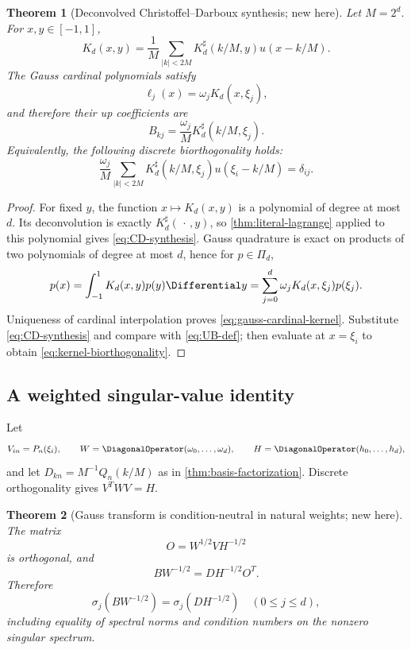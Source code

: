 \documentclass[11pt]{article}
\newtheorem{theorem}{Theorem}[section]
\theoremstyle{definition}
\theoremstyle{remark}
\newcommand{\PiD}{\Pi_d}
\begin{document}
\begin{theorem}[Deconvolved Christoffel--Darboux synthesis; new here]
\label{thm:CD-synthesis}
Let $M=2^d$.  For $x,y\in[-1,1]$,
\begin{equation}
 \boxed{
 K_d(x,y)=\frac1M\sum_{|k|<2M}
 K_d^\sharp(k/M,y)u(x-k/M).}
 \label{eq:CD-synthesis}
\end{equation}
The Gauss cardinal polynomials satisfy
\begin{equation}
 \ell_j(x)=\omega_jK_d(x,\xi_j),
 \label{eq:gauss-cardinal-kernel}
\end{equation}
and therefore their up coefficients are
\begin{equation}
 \boxed{
 B_{kj}=\frac{\omega_j}{M}K_d^\sharp(k/M,\xi_j).}
 \label{eq:B-kernel}
\end{equation}
Equivalently, the following discrete biorthogonality holds:
\begin{equation}
 \frac{\omega_j}{M}\sum_{|k|<2M}
 K_d^\sharp(k/M,\xi_j)u(\xi_i-k/M)=\delta_{ij}.
 \label{eq:kernel-biorthogonality}
\end{equation}
\end{theorem}

\begin{proof}
For fixed $y$, the function $x\mapsto K_d(x,y)$ is a polynomial of degree at
most $d$.  Its deconvolution is exactly $K_d^\sharp(\,\cdot\,,y)$, so
\cref{thm:literal-lagrange} applied to this polynomial gives
\eqref{eq:CD-synthesis}.  Gauss quadrature is exact on products of two
polynomials of degree at most $d$, hence for $p\in\PiD$,
\[
 p(x)=\int_{-1}^1K_d(x,y)p(y)\Differential y
 =\sum_{j=0}^{d}\omega_jK_d(x,\xi_j)p(\xi_j).
\]
Uniqueness of cardinal interpolation proves \eqref{eq:gauss-cardinal-kernel}.
Substitute \eqref{eq:CD-synthesis} and compare with \eqref{eq:UB-def}; then
evaluate at $x=\xi_i$ to obtain \eqref{eq:kernel-biorthogonality}.
\end{proof}

\subsection{A weighted singular-value identity}

Let
\[
 V_{in}=P_n(\xi_i),
 \qquad
 W=\DiagonalOperator(\omega_0,\ldots,\omega_d),
 \qquad
 H=\DiagonalOperator(h_0,\ldots,h_d),
\]
and let $D_{kn}=M^{-1}Q_n(k/M)$ as in \cref{thm:basis-factorization}.
Discrete orthogonality gives $V^TWV=H$.

\begin{theorem}[Gauss transform is condition-neutral in natural weights; new here]
\label{thm:weighted-svd}
The matrix
\[
 O=W^{1/2}VH^{-1/2}
\]
is orthogonal, and
\begin{equation}
 BW^{-1/2}=DH^{-1/2}O^T.
 \label{eq:weighted-factorization}
\end{equation}
Therefore
\begin{equation}
 \boxed{
 \sigma_j(BW^{-1/2})=\sigma_j(DH^{-1/2})
 \quad(0\le j\le d),}
 \label{eq:weighted-svd}
\end{equation}
including equality of spectral norms and condition numbers on the nonzero
singular spectrum.
\end{theorem}
\end{document}
